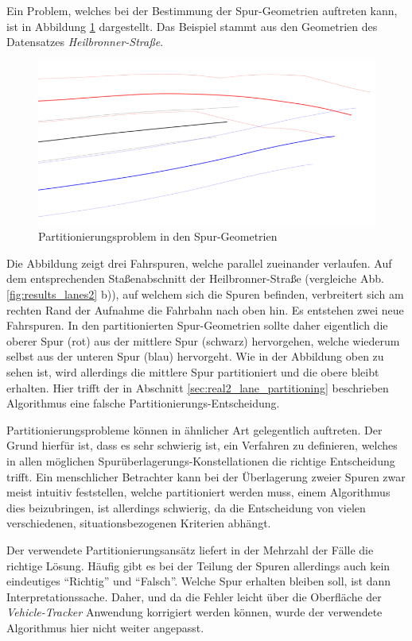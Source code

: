 Ein Problem, welches bei der Bestimmung der Spur-Geometrien auftreten kann, ist in Abbildung
\ref{fig:results_defekts_laneGeos} dargestellt. Das Beispiel stammt aus den Geometrien
des Datensatzes \textit{Heilbronner-Straße}.

\begin{figure}[H]
    \centering
    \includegraphics[width=0.5\linewidth]{resources/img/results/Defekte/Defekt_Part2}
    \caption{Partitionierungsproblem in den Spur-Geometrien}
    \label{fig:results_defekts_laneGeos}
\end{figure}

Die Abbildung zeigt drei Fahrspuren, welche parallel zueinander verlaufen.
Auf dem entsprechenden Staßenabschnitt der Heilbronner-Straße (vergleiche Abb. \ref{fig:results_lanes2} b)),
auf welchem sich die Spuren befinden, verbreitert sich am rechten Rand der Aufnahme die Fahrbahn nach oben hin.
Es entstehen zwei neue Fahrspuren. In den partitionierten Spur-Geometrien sollte daher eigentlich die
oberer Spur (rot) aus der mittlere Spur (schwarz) hervorgehen, welche wiederum selbst aus der unteren
Spur (blau) hervorgeht.
Wie in der Abbildung oben zu sehen ist, wird allerdings die mittlere Spur partitioniert
und die obere bleibt erhalten. Hier trifft der in Abschnitt \ref{sec:real2_lane_partitioning} beschrieben
Algorithmus eine falsche Partitionierungs-Entscheidung.

Partitionierungsprobleme können in ähnlicher Art gelegentlich auftreten. Der Grund hierfür
ist, dass es sehr schwierig ist, ein Verfahren zu definieren, welches in allen möglichen
Spurüberlagerungs-Konstellationen die richtige Entscheidung trifft.
Ein menschlicher Betrachter kann bei der Überlagerung zweier Spuren zwar meist intuitiv feststellen, welche
partitioniert werden muss, einem Algorithmus dies beizubringen, ist allerdings schwierig,
da die Entscheidung von vielen verschiedenen, situationsbezogenen Kriterien abhängt.

Der verwendete Partitionierungsansätz liefert in der Mehrzahl der Fälle die richtige Lösung. 
Häufig gibt es bei der Teilung der Spuren allerdings auch kein eindeutiges ``Richtig'' und ``Falsch''.
Welche Spur erhalten bleiben soll, ist dann Interpretationssache. Daher, und da die Fehler
leicht über die Oberfläche der \textit{Vehicle-Tracker} Anwendung korrigiert werden können, wurde der verwendete
Algorithmus hier nicht weiter angepasst.

